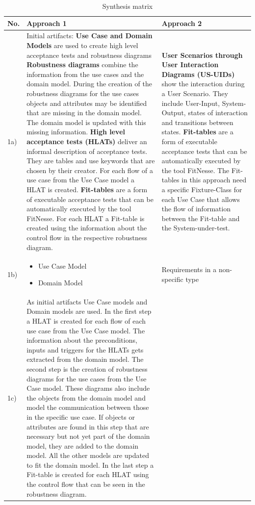 \begin{small} 		
\begin{longtable}[h]{p{0.45cm}|p{}|p{}}
	\caption{Synthesis matrix}
	\label{tab:blub}
	\\    %
	\hline
  	\textbf{No.} & \textbf{Approach 1} & \textbf{Approach 2}\\
  	\hline
  		 1a) & Initial artifacts: \textbf{Use Case and Domain Models} are used to create high level acceptance tests and robustness diagrams 
\textbf{Robustness diagrams} combine the information from the use cases and the domain model. During the creation of the robustness diagrams for the use cases objects and attributes may be identified that are missing in the domain model. The domain model is updated with this missing information.
\textbf{High level acceptance tests (HLATs)} deliver an informal description of acceptance tests. They are tables and use keywords that are chosen by their creator. For each flow of a use case from the Use Case model a HLAT is created.
\textbf{Fit-tables} are a form of executable acceptance tests that can be automatically executed by the tool FitNesse. For each HLAT a Fit-table is created using the information about the control flow in the respective robustness diagram.
 & \textbf{User Scenarios through User Interaction Diagrams (US-UIDs)} show the interaction during a User Scenario. They include User-Input, System-Output, states of interaction and transitions between states.
\textbf{Fit-tables} are a form of executable acceptance tests that can be automatically executed by the tool FitNesse. The Fit-tables in this approach need a specific Fixture-Class for each Use Case that allows the flow of information between the Fit-table and the System-under-test.
 \\
 \hline
  1b) & \begin{itemize}
  		 \item Use Case Model \item Domain Model
\end{itemize}  		  & Requirements in a non-specific type \\
	\hline
  1c) & As initial artifacts Use Case models and Domain models are used.
In the first step a HLAT is created for each flow of each use case from the Use Case model. The information about the preconditions, inputs and triggers for the HLATs gets extracted from the domain model.
The second step is the creation of robustness diagrams for the use cases from the Use Case model. These diagrams also include the objects from the domain model and model the communication between those in the specific use case. If objects or attributes are found in this step that are necessary but not yet part of the domain model, they are added to the domain model. All the other models are updated to fit the domain model. In the last step a Fit-table is created for each HLAT using the control flow that can be seen in the robustness diagram. 

\end{longtable}
\end{small}
